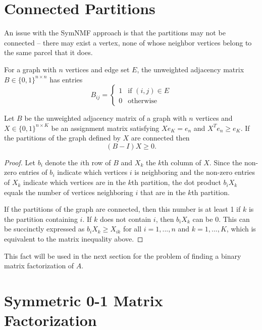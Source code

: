 \section{Connected Partitions}

An issue with the SymNMF approach is that the partitions may not be
connected -- there may exist a vertex, none of whose neighbor vertices
belong to the same parcel that it does.

\begin{definition}
For a graph with $n$ vertices and edge set $E$, the unweighted adjacency
matrix $B \in \{0, 1\}^{n \times n}$ has entries
\[ B_{ij} = \begin{cases}
  1 & \text{if } (i,j) \in E \\
  0 & \text{otherwise}
\end{cases}\]
\end{definition}

\begin{prop} \label{connected}
Let $B$ be the unweighted adjacency matrix of a graph with $n$ vertices
and $X \in \{0, 1\}^{n \times K}$ be an assignment matrix satisfying
$X e_K = e_n$ and $X^T e_n \geq e_K$. If the partitions of the graph
defined by $X$ are connected then
\[ (B - I) X \geq 0. \]

\end{prop}

\begin{proof}
Let $b_i$ denote the $i$th row of $B$ and $X_k$ the
$k$th column of $X$. Since the non-zero entries of $b_i$ indicate
which vertices $i$ is neighboring and the non-zero entries of $X_k$
indicate which vertices are in the $k$th partition, the dot product
$b_i X_k$ equals the number of vertices neighboring $i$ that are in the
$k$th partition.

If the partitions of the graph are connected, then this number is
at least 1 if $k$ is the partition containing $i$. If $k$ does not
contain $i$, then $b_i X_k$ can be 0. This can be succinctly expressed
as $b_i X_k \geq X_{ik}$ for all $i = 1, ..., n$ and $k = 1, ..., K$,
which is equivalent to the matrix inequality above.
\end{proof}

This fact will be used in the next section for the problem of finding
a binary matrix factorization of $A$.


\section{Symmetric 0-1 Matrix Factorization}

